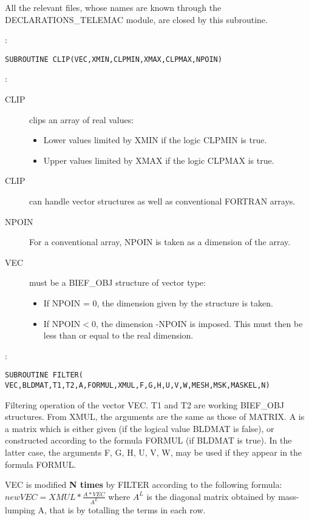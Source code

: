 All the relevant files, whose names are known through the DECLARATIONS\_TELEMAC
module, are closed by this subroutine.

:
\begin{lstlisting}[language=TelFortran]
SUBROUTINE CLIP(VEC,XMIN,CLPMIN,XMAX,CLPMAX,NPOIN)
\end{lstlisting}

:
\begin{description}
  \item [CLIP] clips an array of real values:
    \begin{itemize}
      \item Lower values limited by XMIN if the logic CLPMIN is true.
      \item Upper values limited by XMAX if the logic CLPMAX is true.
    \end{itemize}
  \item [CLIP] can handle vector structures as well as conventional FORTRAN
    arrays.
  \item [NPOIN] For a conventional array, NPOIN is taken as a dimension of the
    array.
  \item [VEC] must be a BIEF\_OBJ structure of vector type:
    \begin{itemize}
      \item If NPOIN = 0, the dimension given by the structure is taken.
      \item If NPOIN$<$0, the dimension -NPOIN is imposed. This must then be
        less than or equal to the real dimension.
    \end{itemize}
\end{description}

:
\begin{lstlisting}[language=TelFortran]
SUBROUTINE FILTER( VEC,BLDMAT,T1,T2,A,FORMUL,XMUL,F,G,H,U,V,W,MESH,MSK,MASKEL,N)
\end{lstlisting}

Filtering operation of the vector VEC. T1 and T2 are working BIEF\_OBJ
structures. From XMUL, the arguments are the same as those of MATRIX. A is a
matrix which is either given (if the logical value BLDMAT is false), or
constructed according to the formula FORMUL (if BLDMAT is true). In the latter
case, the arguments F, G, H, U, V, W, may be used if they appear in the formula
FORMUL.

VEC is modified \textbf{N times} by FILTER according to the following formula:
$new VEC = XMUL*\frac{A*VEC}{A^{L}}$
where $A^{L}$ is the diagonal matrix obtained by mass-lumping A, that is by
totalling the terms in each row.

